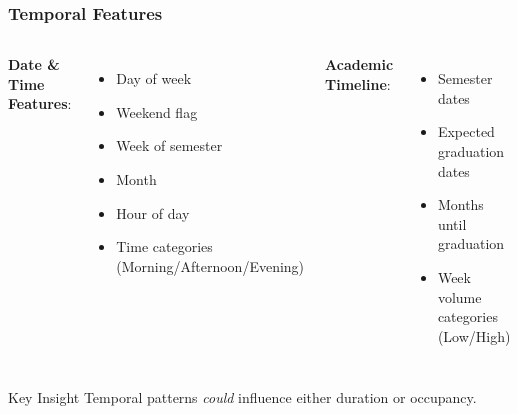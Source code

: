 \documentclass{beamer}
\begin{document}
\begin{frame}
\frametitle{Temporal Features}
    \begin{columns}[T]
        \textbf{Date \& Time Features}:
            \begin{itemize}
            \item Day of week
            \item Weekend flag
            \item Week of semester
            \item Month
            \item Hour of day
            \item Time categories (Morning/Afternoon/Evening)
            \end{itemize}
            
        \textbf{Academic Timeline}:
            \begin{itemize}
            \item Semester dates
            \item Expected graduation dates
            \item Months until graduation
            \item Week volume categories (Low/High)
            \end{itemize}
    \end{columns}

    \begin{alertblock}{Key Insight}
        Temporal patterns \textit{could} influence either duration or occupancy.
    \end{alertblock}
\end{frame}
\end{document}
